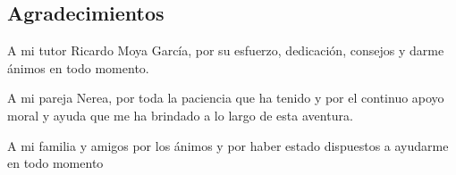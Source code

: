 \begin{flushright}
	\section*{Agradecimientos}
	A mi tutor Ricardo Moya García, por su esfuerzo, dedicación, consejos y darme ánimos en todo momento.
	 
	A mi pareja Nerea, por toda la paciencia que ha tenido y por el continuo apoyo moral y ayuda que me ha brindado a lo largo de esta aventura.
	 
	A mi familia y amigos por los ánimos y por haber estado dispuestos a ayudarme en todo momento
\end{flushright}